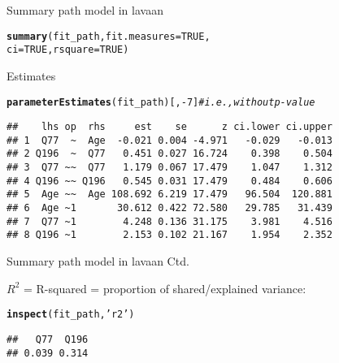 \documentclass[10pt]{beamer}\usepackage[]{graphicx}\usepackage[]{xcolor}
\makeatletter
\newcommand{\hlnum}[1]{\textcolor[rgb]{0.686,0.059,0.569}{#1}}%
\newcommand{\hlsng}[1]{\textcolor[rgb]{0.192,0.494,0.8}{#1}}%
\newcommand{\hlcom}[1]{\textcolor[rgb]{0.678,0.584,0.686}{\textit{#1}}}%
\newcommand{\hlopt}[1]{\textcolor[rgb]{0,0,0}{#1}}%
\newcommand{\hldef}[1]{\textcolor[rgb]{0.345,0.345,0.345}{#1}}%
\newcommand{\hlkwc}[1]{\textcolor[rgb]{0.333,0.667,0.333}{#1}}%
\newcommand{\hlkwd}[1]{\textcolor[rgb]{0.737,0.353,0.396}{\textbf{#1}}}%
\newenvironment{kframe}{%
 \def\at@end@of@kframe{}%
 \ifinner\ifhmode%
  \def\at@end@of@kframe{\end{minipage}}%
  \begin{minipage}{\columnwidth}%
 \fi\fi%
 \def\FrameCommand##1{\hskip\@totalleftmargin \hskip-\fboxsep
 \colorbox{shadecolor}{##1}\hskip-\fboxsep
     \hskip-\linewidth \hskip-\@totalleftmargin \hskip\columnwidth}%
 \MakeFramed {\advance\hsize-\width
   \@totalleftmargin\z@ \linewidth\hsize
   \@setminipage}}%
 {\par\unskip\endMakeFramed%
 \at@end@of@kframe}
\newenvironment{knitrout}{}{} %
\makeatother
\begin{document}
\begin{frame}[fragile]{Summary path model in lavaan}

\begin{knitrout}
\color{fgcolor}\begin{kframe}
\begin{alltt}
\hlkwd{summary}\hldef{(fit_path,} \hlkwc{fit.measures} \hldef{=} \hlnum{TRUE}\hldef{,}
        \hlkwc{ci} \hldef{=} \hlnum{TRUE}\hldef{,} \hlkwc{rsquare} \hldef{=} \hlnum{TRUE}\hldef{)}
\end{alltt}
\end{kframe}
\end{knitrout}

Estimates 
\begin{knitrout}
\color{fgcolor}\begin{kframe}
\begin{alltt}
\hlkwd{parameterEstimates}\hldef{(fit_path)[,}\hlopt{-}\hlnum{7}\hldef{]} \hlcom{# i.e., without p-value}
\end{alltt}
\begin{verbatim}
##    lhs op  rhs     est    se      z ci.lower ci.upper
## 1  Q77  ~  Age  -0.021 0.004 -4.971   -0.029   -0.013
## 2 Q196  ~  Q77   0.451 0.027 16.724    0.398    0.504
## 3  Q77 ~~  Q77   1.179 0.067 17.479    1.047    1.312
## 4 Q196 ~~ Q196   0.545 0.031 17.479    0.484    0.606
## 5  Age ~~  Age 108.692 6.219 17.479   96.504  120.881
## 6  Age ~1       30.612 0.422 72.580   29.785   31.439
## 7  Q77 ~1        4.248 0.136 31.175    3.981    4.516
## 8 Q196 ~1        2.153 0.102 21.167    1.954    2.352
\end{verbatim}
\end{kframe}
\end{knitrout}

\end{frame}
%
\begin{frame}[fragile]{Summary path model in lavaan Ctd.}

$R^2$ = R-squared = proportion of shared/explained variance:
\begin{knitrout}
\color{fgcolor}\begin{kframe}
\begin{alltt}
\hlkwd{inspect}\hldef{(fit_path,} \hlsng{'r2'}\hldef{)}
\end{alltt}
\begin{verbatim}
##   Q77  Q196 
## 0.039 0.314
\end{verbatim}
\end{kframe}
\end{knitrout}

%

\end{frame}
\end{document}
